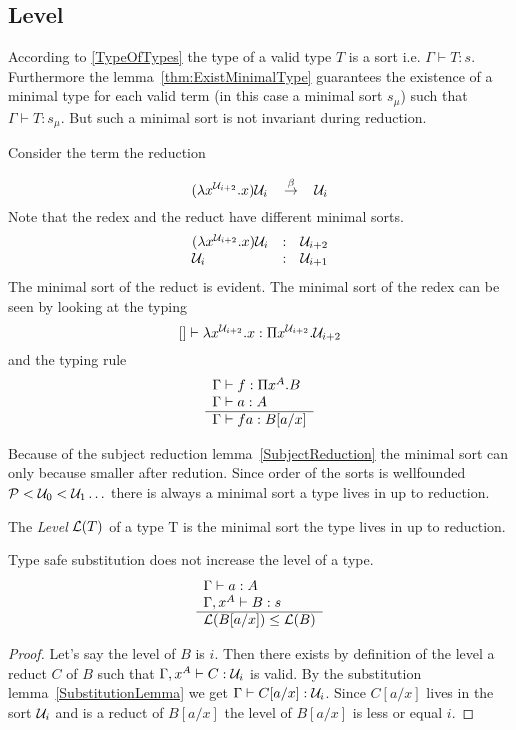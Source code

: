 \subsection{Level}



According to \ref{TypeOfTypes} the type of a valid type $T$ is a sort i.e.
$\Gamma \vdash T: s$. Furthermore the lemma~\ref{thm:ExistMinimalType}
guarantees the existence of a minimal type for each valid term (in this case a
minimal sort $s_\mu$) such that $\Gamma \vdash T: s_\mu$. But such a minimal
sort is not invariant during reduction.

Consider the term the reduction

$$
(\lambda x^{{\cal U}_{i+2}}. x) {\cal U}_i \quad{\,\stackrel{\beta}{\to}\,}\quad {\cal U}_i
$$
Note that the redex and the reduct have different minimal sorts.
$$
\begin{array}{lllll} 
    (\lambda x^{{\cal U}_{i+2}}. x) {\cal U}_i
    &:&
    {\cal U}_{i+2}
    \\
    {\cal U}_i
    &:&
    {\cal U}_{i+1}
 \end{array}
$$
The minimal sort of the reduct is evident. The minimal sort of the redex can be
seen by looking at the typing
$$
    [] \vdash \lambda x^{{\cal U}_{i+2}} . x : \Pi x^{{\cal U}_{i+2}}. {\cal U}_{i+2}
$$
and the typing rule
$$
\begin{array}{l} 
    \Gamma \vdash f: \Pi x^A. B
    \\
    \Gamma \vdash a: A
 \\ \hline 
    \Gamma \vdash f a: B[a/x]
\end{array}
$$



Because of the subject reduction lemma~\ref{SubjectReduction} the minimal sort
can only because smaller after redution.  Since order of the sorts is
wellfounded ${\cal P} < {\cal U}_0 < {\cal U}_1 \ldots$ there is always a minimal sort a
type lives in up to reduction.



\begin{definition}
    The \emph{Level} ${\cal L}(T)$ of a type T
    is the minimal sort
    the type lives in up to reduction.
\end{definition}


\begin{theorem}
    \label{thm:LevelTypeSafeSubstitution}
    Type safe substitution does not increase the level of a type.
    $$
    \begin{array}{l} 
        \Gamma \vdash a : A
        \\
        \Gamma, x^A \vdash B: s
     \\ \hline 
        {\cal L}(B[a/x]) \le {\cal L}(B)
    \end{array}
    $$
    \begin{proof}
        Let's say the level of $B$ is $i$. Then there exists by definition of
        the level a reduct $C$ of $B$ such that $\Gamma, x^A \vdash C: {\cal U}_i$
        is valid. By the substitution lemma~\ref{SubstitutionLemma} we get
        $\Gamma \vdash C[a/x]: {\cal U}_i$. Since $C[a/x]$ lives in the sort
        ${\cal U}_i$ and is a reduct of $B[a/x]$ the level of $B[a/x]$ is less or
        equal $i$.
    \end{proof}
\end{theorem}




